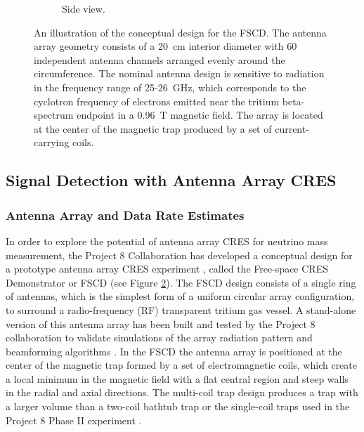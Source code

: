 \begin{figure}[h]
\begin{subfigure}{0.48\textwidth}
        \caption{Side view.}
        \label{fig:apparatus_concept_side}
    \end{subfigure}
    \caption{An illustration of the conceptual design for the FSCD. The antenna array geometry consists of a 20~cm interior diameter with 60 independent antenna channels arranged evenly around the circumference. The nominal antenna design is sensitive to radiation in the frequency range of 25-26~GHz, which corresponds to the cyclotron frequency of electrons emitted near the tritium beta-spectrum endpoint in a 0.96~T magnetic field. The array is located at the center of the magnetic trap produced by a set of current-carrying coils.}
    \label{fig:apparatus_concept}
\end{figure}


\subsection{Signal Detection with Antenna Array CRES}
\label{sec:real-time-triggering}


\subsubsection{Antenna Array and Data Rate Estimates}
\label{sec:aa-and-daq}

In order to explore the potential of antenna array CRES for neutrino mass measurement, the Project 8 Collaboration has developed a conceptual design for a prototype antenna array CRES experiment \cite{p8PanicProc,p8snowmass2022}, called the Free-space CRES Demonstrator or FSCD (see Figure \ref{fig:apparatus_concept}). The FSCD design consists of a single ring of antennas, which is the simplest form of a uniform circular array configuration, to surround a radio-frequency (RF) transparent tritium gas vessel. A stand-alone version of this antenna array has been built and tested by the Project 8 collaboration \cite{p8jugaad} to validate simulations of the array radiation pattern and beamforming algorithms \cite{balanis}. In the FSCD the antenna array is positioned at the center of the magnetic trap formed by a set of electromagnetic coils, which create a local minimum in the magnetic field with a flat central region and steep walls in the radial and axial directions. The multi-coil trap design produces a trap with a larger volume than a two-coil bathtub trap or the single-coil traps used in the Project 8 Phase II experiment \cite{p8prl2023}.

